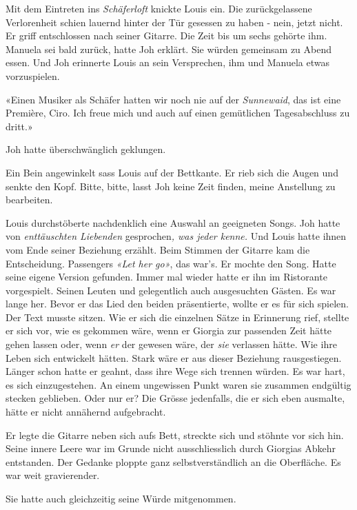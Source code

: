 Mit dem Eintreten ins \emph{Schäferloft} knickte Louis ein. Die zurückgelassene
Verlorenheit schien lauernd hinter der Tür gesessen zu haben - nein, jetzt nicht. Er griff entschlossen nach seiner Gitarre. Die Zeit bis um sechs gehörte ihm. Manuela sei bald zurück, hatte Joh erklärt. Sie würden gemeinsam zu Abend essen. Und Joh erinnerte Louis an sein Versprechen, ihm und Manuela etwas vorzuspielen.

«Einen Musiker als Schäfer hatten wir noch nie auf der \emph{Sunnewaid},
das ist eine Première, Ciro. Ich freue mich und auch auf einen
gemütlichen Tagesabschluss zu dritt.»

Joh hatte überschwänglich geklungen.

Ein Bein angewinkelt sass Louis auf der Bettkante. Er rieb sich die Augen und senkte den Kopf. Bitte, bitte, lasst Joh keine Zeit finden, meine Anstellung zu bearbeiten. 

Louis durchstöberte nachdenklich eine Auswahl an geeigneten Songs. Joh hatte von \emph{enttäuschten Liebenden}
gesprochen\emph{, was jeder kenne.} Und Louis hatte ihnen vom Ende
seiner Beziehung erzählt. 
Beim Stimmen der Gitarre kam die Entscheidung. Passengers \emph{«Let her go»}, das
war’s.
Er mochte den Song. Hatte seine eigene Version gefunden. Immer mal
wieder hatte er ihn im Ristorante vorgespielt. Seinen Leuten und 
gelegentlich auch ausgesuchten Gästen. Es war lange her. Bevor er das Lied den beiden präsentierte, wollte er es für sich spielen. Der Text musste sitzen. Wie er sich die einzelnen Sätze in Erinnerung rief, 
stellte er sich vor, wie es gekommen wäre, wenn er Giorgia zur passenden Zeit hätte gehen lassen oder, wenn
\emph{er} der gewesen wäre, der \emph{sie} verlassen hätte. Wie ihre
Leben sich entwickelt hätten. Stark wäre er aus dieser Beziehung rausgestiegen. Länger schon hatte er geahnt, dass ihre Wege sich trennen würden. Es war hart, es sich einzugestehen. An einem
ungewissen Punkt waren sie zusammen endgültig stecken geblieben. Oder nur er? Die
Grösse jedenfalls, die er sich eben ausmalte, hätte er nicht annähernd aufgebracht. 

Er legte die Gitarre neben sich aufs Bett, streckte sich und stöhnte vor sich hin. Seine innere Leere war im Grunde nicht ausschliesslich durch Giorgias Abkehr entstanden. Der Gedanke ploppte ganz selbstverständlich an die
Oberfläche. Es war weit gravierender. 

Sie hatte auch gleichzeitig seine Würde mitgenommen.
